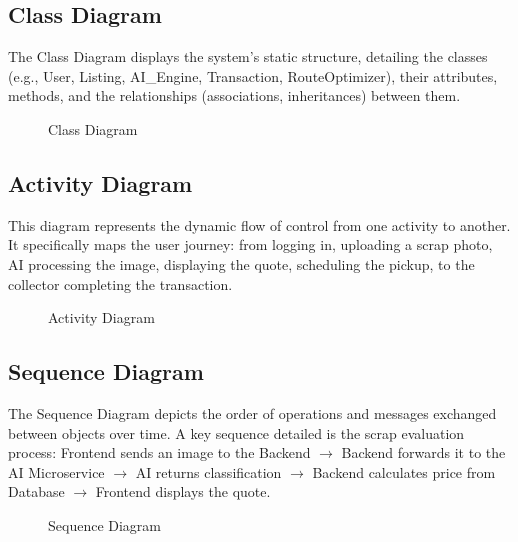 \subsection{Class Diagram}
The Class Diagram displays the system's static structure, detailing the classes (e.g., User, Listing, AI\_Engine, Transaction, RouteOptimizer), their attributes, methods, and the relationships (associations, inheritances) between them.
\begin{figure}[H]
    \centering
    \vspace{5cm}
    \caption{Class Diagram}
    \label{fig:class_diagram}
\end{figure}

\subsection{Activity Diagram}
This diagram represents the dynamic flow of control from one activity to another. It specifically maps the user journey: from logging in, uploading a scrap photo, AI processing the image, displaying the quote, scheduling the pickup, to the collector completing the transaction.
\begin{figure}[H]
    \centering
    \vspace{5cm}
    \caption{Activity Diagram}
    \label{fig:activity_diagram}
\end{figure}

\subsection{Sequence Diagram}
The Sequence Diagram depicts the order of operations and messages exchanged between objects over time. A key sequence detailed is the scrap evaluation process: Frontend sends an image to the Backend $\rightarrow$ Backend forwards it to the AI Microservice $\rightarrow$ AI returns classification $\rightarrow$ Backend calculates price from Database $\rightarrow$ Frontend displays the quote.
\begin{figure}[H]
    \centering
    \vspace{5cm}
    \caption{Sequence Diagram}
    \label{fig:sequence_diagram}
\end{figure}


